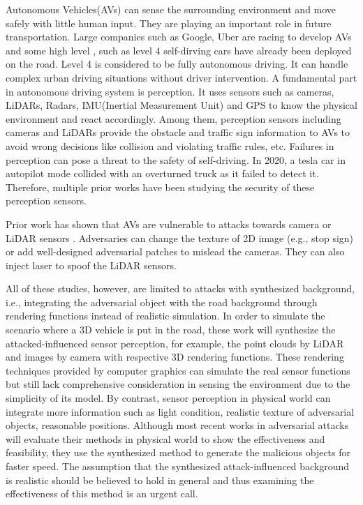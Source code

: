 
Autonomous Vehicles(AVs) can sense the surrounding environment and move safely with little human input.
They are playing an important role in future transportation. Large companies such as Google,
Uber\cite{1} are racing to develop AVs and some high level , such as level 4 self-dirving cars have already been deployed on the road. 
Level 4 is considered to be fully autonomous driving. It can handle complex urban driving situations without driver intervention. 
A fundamental part in autonomous driving system is perception.
It uses sensors\cite{17} such as cameras, LiDARs, Radars, IMU(Inertial
Measurement Unit) and GPS to know the physical environment and react accordingly. Among them, perception sensors
including cameras and LiDARs provide the obstacle and traffic sign information to AVs to avoid wrong decisions like
collision and violating traffic rules, etc. 
Failures in perception can pose a threat to the safety of self-driving. 
In 2020, a tesla car in autopilot mode collided with an overturned truck as it failed to detect it.
Therefore, multiple prior works have been studying the security of these perception sensors.

Prior work has shown that AVs are vulnerable to attacks
towards camera \cite{7, 9, 23} or LiDAR sensors \cite{4, 6, 19, 25}.
Adversaries can change the texture of 2D image \cite{23}(e.g.,
stop sign) or add well-designed adversarial patches\cite{9} to
mislead the cameras. They can also inject laser\cite{6} to spoof
the LiDAR sensors.

All of these studies, however, are limited to attacks with synthesized background, 
i.e., integrating the adversarial object with the road background through rendering functions instead of realistic simulation\cite{23, 25, msf-adv, black-lidar, 19}.
In order to simulate the scenario where a 3D vehicle is put in the road, 
these work will synthesize the attacked-influenced sensor perception, for example, the point clouds by LiDAR and images by camera with respective 3D rendering functions.
These rendering techniques provided by computer graphics can simulate the real sensor functions
 but still lack comprehensive consideration in sensing the environment due to the simplicity of its model.
By contrast, sensor perception in physical world can integrate more information such as light condition, realistic texture of adversarial objects, reasonable positions.
Although most recent works in adversarial attacks will evaluate their methods in physical world to show the effectiveness and feasibility,
they use the synthesized method to generate the malicious objects for faster speed.
The assumption that the synthesized attack-influenced background is realistic should be believed to hold in general\cite{msf-adv} and thus examining the effectiveness of this method is an urgent call.

